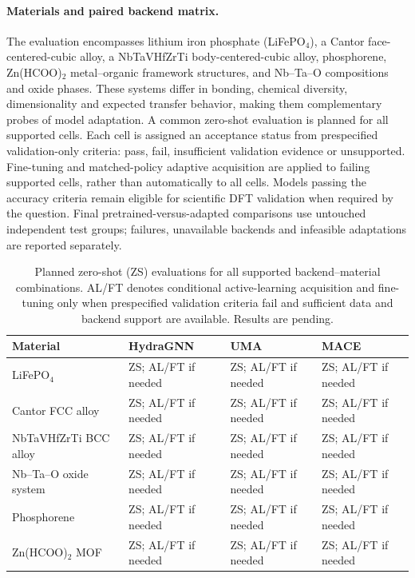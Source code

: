 \documentclass[11pt,a4paper]{article}
\begin{document}
\paragraph{Materials and paired backend matrix.}
The evaluation encompasses lithium iron phosphate (LiFePO$_4$), a Cantor face-centered-cubic alloy, a NbTaVHfZrTi body-centered-cubic alloy, phosphorene, Zn(HCOO)$_2$ metal--organic framework structures, and Nb--Ta--O compositions and oxide phases. These systems differ in bonding, chemical diversity, dimensionality and expected transfer behavior, making them complementary probes of model adaptation. A common zero-shot evaluation is planned for all supported cells. Each cell is assigned an acceptance status from prespecified validation-only criteria: pass, fail, insufficient validation evidence or unsupported. Fine-tuning and matched-policy adaptive acquisition are applied to failing supported cells, rather than automatically to all cells. Models passing the accuracy criteria remain eligible for scientific DFT validation when required by the question. Final pretrained-versus-adapted comparisons use untouched independent test groups; failures, unavailable backends and infeasible adaptations are reported separately.

\begin{table}[htbp]
\centering\small
\caption{\textcolor{red!80!black}{Planned zero-shot (ZS) evaluations for all supported backend--material combinations. AL/FT denotes conditional active-learning acquisition and fine-tuning only when prespecified validation criteria fail and sufficient data and backend support are available. Results are pending.}}
\label{tab:new_mlip_matrix}
\begin{tabular}{@{}llll@{}}
\toprule
Material & HydraGNN & UMA & MACE \\
\midrule
LiFePO$_4$ & \textcolor{red!80!black}{ZS; AL/FT if needed} & \textcolor{red!80!black}{ZS; AL/FT if needed} & \textcolor{red!80!black}{ZS; AL/FT if needed} \\
Cantor FCC alloy & \textcolor{red!80!black}{ZS; AL/FT if needed} & \textcolor{red!80!black}{ZS; AL/FT if needed} & \textcolor{red!80!black}{ZS; AL/FT if needed} \\
NbTaVHfZrTi BCC alloy & \textcolor{red!80!black}{ZS; AL/FT if needed} & \textcolor{red!80!black}{ZS; AL/FT if needed} & \textcolor{red!80!black}{ZS; AL/FT if needed} \\
Nb--Ta--O oxide system & \textcolor{red!80!black}{ZS; AL/FT if needed} & \textcolor{red!80!black}{ZS; AL/FT if needed} & \textcolor{red!80!black}{ZS; AL/FT if needed} \\
Phosphorene & \textcolor{red!80!black}{ZS; AL/FT if needed} & \textcolor{red!80!black}{ZS; AL/FT if needed} & \textcolor{red!80!black}{ZS; AL/FT if needed} \\
Zn(HCOO)$_2$ MOF & \textcolor{red!80!black}{ZS; AL/FT if needed} & \textcolor{red!80!black}{ZS; AL/FT if needed} & \textcolor{red!80!black}{ZS; AL/FT if needed} \\
\bottomrule
\end{tabular}
\end{table}
\end{document}
